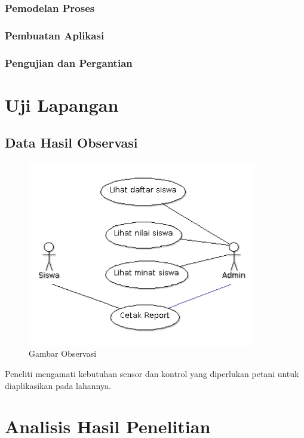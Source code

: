 \begin{flushleft}
\begin{justify}
        \subsubsection{Pemodelan Proses}
        \subsubsection{Pembuatan Aplikasi}
        \subsubsection{Pengujian dan Pergantian}


        \section{Uji Lapangan}

    \end{justify}




    
    \subsection{Data Hasil Observasi}
\vspace{5cm}
\begin{figure}[ht]
	\centering
	\includegraphics[width=10cm]{images/UseCaseDiagramSistemSaatIni}
	\caption{Gambar Observasi}
\end{figure}
Peneliti mengamati kebutuhan sensor dan kontrol yang diperlukan petani untuk diaplikasikan pada lahannya. 
    \section{Analisis Hasil Penelitian}

\end{flushleft}

